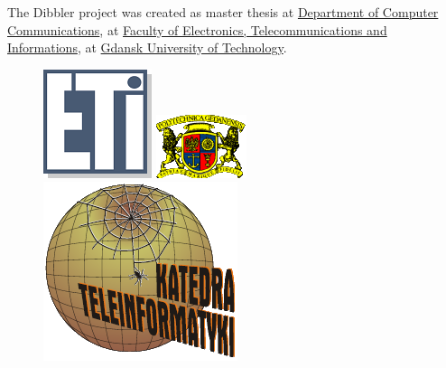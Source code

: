 \vspace{1cm}

\noindent
The Dibbler project was created as master thesis at 
\href{http://www.eti.pg.gda.pl/lang?locale=en/}{Department
of Computer Communications}, at \href{http://www.eti.pg.gda.pl/lang?locale=en}{Faculty of Electronics,
Telecommunications and Informations}, at \href{http://www.pg.gda.pl/en/}{Gdansk University of Technology}.

\begin{figure}[ht]
\begin{minipage}[b]{0.33\linewidth}
\centering
\includegraphics[scale=1.0]{logo-eti}
\vspace{-0.8cm}
\end{minipage}
\begin{minipage}[b]{0.33\linewidth}
\centering
\includegraphics[scale=1.1]{logo-pg}
\end{minipage}
\hspace{0.5cm}
\begin{minipage}[b]{0.33\linewidth}
\centering
\includegraphics[scale=0.6]{logo-kti}
\end{minipage}
\end{figure}

\newpage
